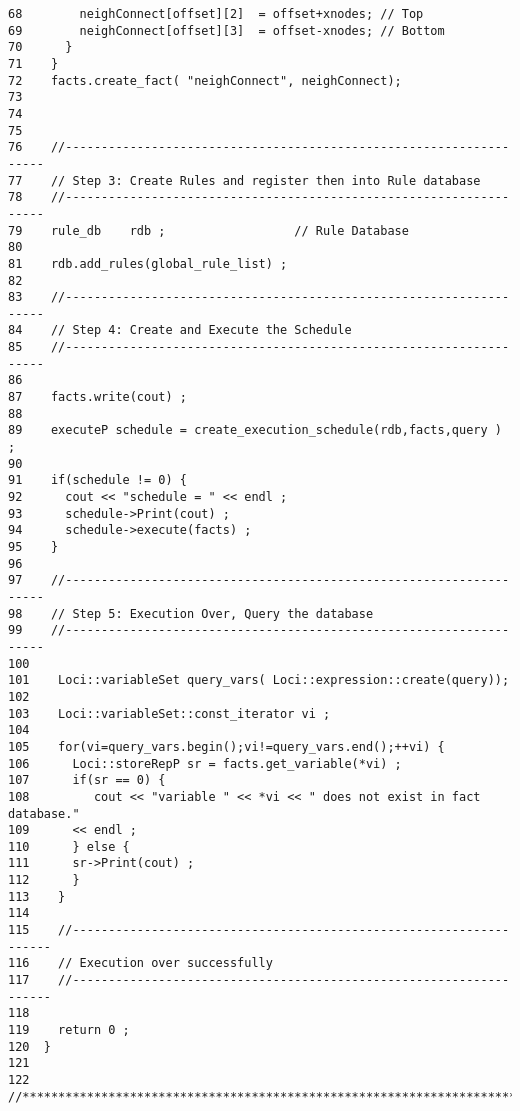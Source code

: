 \begin{verbatim}
68        neighConnect[offset][2]  = offset+xnodes; // Top
69        neighConnect[offset][3]  = offset-xnodes; // Bottom
70      }
71    }
72    facts.create_fact( "neighConnect", neighConnect);
73
74
75
76    //-------------------------------------------------------------------
77    // Step 3: Create Rules and register then into Rule database
78    //-------------------------------------------------------------------
79    rule_db    rdb ;                  // Rule Database
80
81    rdb.add_rules(global_rule_list) ;
82
83    //-------------------------------------------------------------------
84    // Step 4: Create and Execute the Schedule
85    //-------------------------------------------------------------------
86
87    facts.write(cout) ;
88
89    executeP schedule = create_execution_schedule(rdb,facts,query ) ;
90
91    if(schedule != 0) {
92      cout << "schedule = " << endl ;
93      schedule->Print(cout) ;
94      schedule->execute(facts) ;
95    }
96
97    //-------------------------------------------------------------------
98    // Step 5: Execution Over, Query the database
99    //-------------------------------------------------------------------
100
101    Loci::variableSet query_vars( Loci::expression::create(query));
102
103    Loci::variableSet::const_iterator vi ;
104
105    for(vi=query_vars.begin();vi!=query_vars.end();++vi) {
106      Loci::storeRepP sr = facts.get_variable(*vi) ;
107      if(sr == 0) {
108         cout << "variable " << *vi << " does not exist in fact database."
109      << endl ;
110      } else {
111      sr->Print(cout) ;
112      }
113    }
114
115    //-------------------------------------------------------------------
116    // Execution over successfully
117    //-------------------------------------------------------------------
118
119    return 0 ;
120  }
121
122  //*********************************************************************
\end{verbatim}

